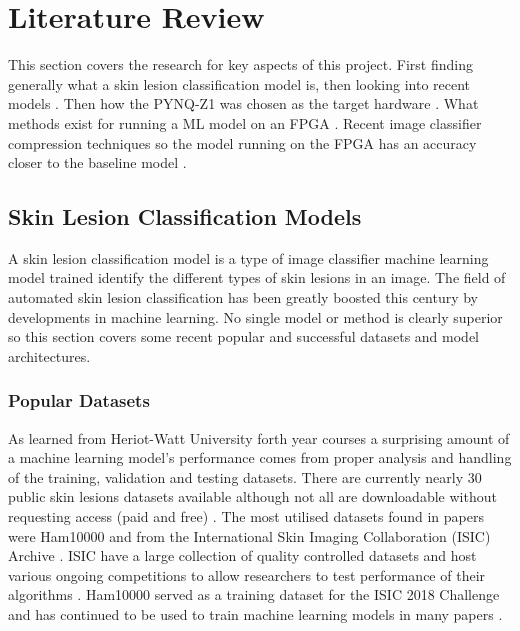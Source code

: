 \documentclass[12pt,nonacm,acmlarge,titlepage,screen]{acmart}
\begin{document}
\section{Literature Review} \label{sec:lit_rev}
This section covers the research for key aspects of this project. First finding generally what a skin lesion classification model is, then looking into recent models . Then how the PYNQ-Z1 was chosen as the target hardware . What methods exist for running a ML model on an FPGA . Recent image classifier compression techniques so the model running on the FPGA has an accuracy closer to the baseline model .


	
	\subsection{Skin Lesion Classification Models} \label{lit:models}
	A skin lesion classification model is a type of image classifier machine learning model trained identify the different types of skin lesions in an image. The field of automated skin lesion classification has been greatly boosted this century by developments in machine learning. No single model or method is clearly superior so this section covers some recent popular and successful datasets and model architectures.

		\subsubsection{Popular Datasets}
		As learned from Heriot-Watt University forth year courses a surprising amount of a machine learning model's performance comes from proper analysis and handling of the training, validation and testing datasets. There are currently nearly 30 public skin lesions datasets available although not all are downloadable without requesting access (paid and free) \cite{survey_datasets_2021, survey_2023}. The most utilised datasets found in papers were Ham10000 \cite{ham_paper, ham_src} and from the International Skin Imaging Collaboration (ISIC) Archive \cite{isic_site}. ISIC  have a large collection of quality controlled datasets and host various ongoing competitions to allow researchers to test performance of their algorithms \cite{isic_site_challenge, isic_site}. Ham10000 served as a training dataset for the ISIC 2018 Challenge \cite{isic_2018_challenge} and has continued to be used to train machine learning models in many papers \cite{survey_2023, survey_general_2023}.
\end{document}
